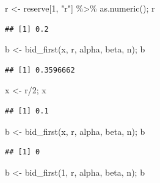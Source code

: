 \documentclass[
]{book}
\newenvironment{Shaded}{\begin{snugshade}}{\end{snugshade}}
\newcommand{\DecValTok}[1]{\textcolor[rgb]{0.00,0.00,0.81}{#1}}
\newcommand{\FunctionTok}[1]{\textcolor[rgb]{0.00,0.00,0.00}{#1}}
\newcommand{\NormalTok}[1]{#1}
\newcommand{\OtherTok}[1]{\textcolor[rgb]{0.56,0.35,0.01}{#1}}
\newcommand{\SpecialCharTok}[1]{\textcolor[rgb]{0.00,0.00,0.00}{#1}}
\newcommand{\StringTok}[1]{\textcolor[rgb]{0.31,0.60,0.02}{#1}}
\begin{document}
\begin{Shaded}
\begin{Highlighting}[]
\NormalTok{r }\OtherTok{\textless{}{-}}\NormalTok{ reserve[}\DecValTok{1}\NormalTok{, }\StringTok{"r"}\NormalTok{] }\SpecialCharTok{\%\textgreater{}\%} \FunctionTok{as.numeric}\NormalTok{(); r}
\end{Highlighting}
\end{Shaded}

\begin{verbatim}
## [1] 0.2
\end{verbatim}

\begin{Shaded}
\begin{Highlighting}[]
\NormalTok{b }\OtherTok{\textless{}{-}} \FunctionTok{bid\_first}\NormalTok{(x, r, alpha, beta, n); b}
\end{Highlighting}
\end{Shaded}

\begin{verbatim}
## [1] 0.3596662
\end{verbatim}

\begin{Shaded}
\begin{Highlighting}[]
\NormalTok{x }\OtherTok{\textless{}{-}}\NormalTok{ r}\SpecialCharTok{/}\DecValTok{2}\NormalTok{; x}
\end{Highlighting}
\end{Shaded}

\begin{verbatim}
## [1] 0.1
\end{verbatim}

\begin{Shaded}
\begin{Highlighting}[]
\NormalTok{b }\OtherTok{\textless{}{-}} \FunctionTok{bid\_first}\NormalTok{(x, r, alpha, beta, n); b}
\end{Highlighting}
\end{Shaded}

\begin{verbatim}
## [1] 0
\end{verbatim}

\begin{Shaded}
\begin{Highlighting}[]
\NormalTok{b }\OtherTok{\textless{}{-}} \FunctionTok{bid\_first}\NormalTok{(}\DecValTok{1}\NormalTok{, r, alpha, beta, n); b}
\end{Highlighting}
\end{Shaded}
\end{document}
